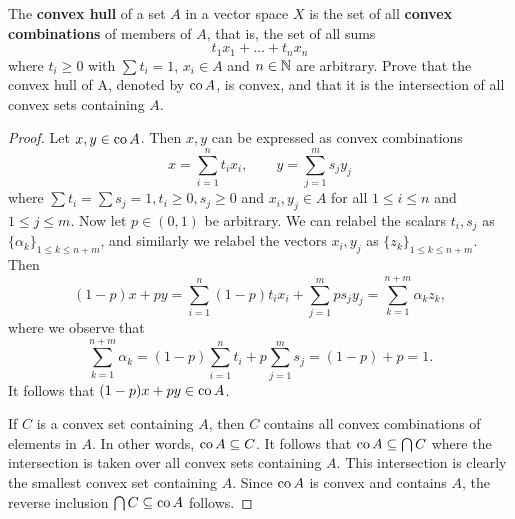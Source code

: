 \begin{exercise}
	The \textbf{convex hull} of a set $A$ in a vector space $X$ is the set of all \textbf{convex combinations} of members of $A$, that is, the set of all sums
	\begin{equation*}
		t_1 x_1 + \ldots + t_n x_n
	\end{equation*}
	where $t_i \ge 0$ with $\sum t_i = 1$, $x_i \in A$ and $n \in \mathbb{N}$ are arbitrary. Prove that the convex hull of A, denoted by $\operatorname{co} A$, is convex, and that it is the intersection of all convex sets containing $A$.
\end{exercise}

\begin{proof}
	Let $x, y \in \operatorname{co} A$. Then $x, y$ can be expressed as convex combinations
	\begin{equation*}
		x = \sum_{i=1}^n t_i x_i, \qquad y = \sum_{j=1}^m s_j y_j
	\end{equation*}
	where $\sum t_i = \sum s_j = 1, t_i \ge 0, s_j \ge 0$ and $x_i, y_j \in A$ for all $1\le i \le n$ and $1\le j \le m$. Now let $p \in (0,1)$ be arbitrary. We can relabel the scalars $t_i, s_j$ as $\{\alpha_k\}_{1\le k \le n+m}$, and similarly we relabel the vectors $x_i, y_j$ as $\{z_k\}_{1\le k \le n+m}$. Then
	\begin{equation*}
		(1-p)x + py = \sum_{i=1}^n (1-p)t_i x_i + \sum_{j=1}^m ps_j y_j = \sum_{k=1}^{n+m} \alpha_k z_k,
	\end{equation*}
	where we observe that
	\begin{equation*}
		\sum_{k=1}^{n+m}\alpha_k = (1-p)\sum_{i=1}^n t_i + p\sum_{j=1}^m s_j = (1-p) + p = 1.
	\end{equation*}
	It follows that $(1-p)x + py \in \operatorname{co} A$.
	
	If $C$ is a convex set containing $A$, then $C$ contains all convex combinations of elements in $A$. In other words, $\operatorname{co} A \subseteq C$. It follows that $\operatorname{co} A \subseteq \bigcap C$ where the intersection is taken over all convex sets containing $A$. This intersection is clearly the smallest convex set containing $A$. Since $\operatorname{co} A$ is convex and contains $A$, the reverse inclusion $\bigcap C \subseteq \operatorname{co} A$ follows.
\end{proof}

